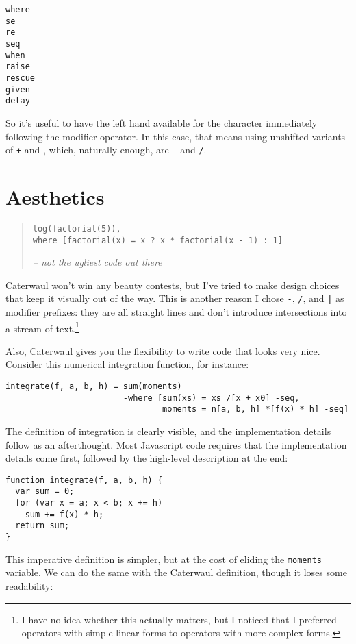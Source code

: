\documentclass{report}
\begin{document}
\begin{verbatim}
where
se
re
seq
when
raise
rescue
given
delay
\end{verbatim}

    So it's useful to have the left hand available for the character immediately following the modifier operator. In this case, that means using unshifted variants of {\tt +} and {\tt *},
    which, naturally enough, are {\tt -} and {\tt /}.

\section{Aesthetics}
\begin{quote}
\begin{verbatim}
log(factorial(5)),
where [factorial(x) = x ? x * factorial(x - 1) : 1]
\end{verbatim}
\hfill \textit{-- not the ugliest code out there}
\end{quote}

    Caterwaul won't win any beauty contests, but I've tried to make design choices that keep it visually out of the way. This is another reason I chose {\tt -}, {\tt /}, and {\tt |} as
    modifier prefixes: they are all straight lines and don't introduce intersections into a stream of text.\footnote{I have no idea whether this actually matters, but I noticed that I
    preferred operators with simple linear forms to operators with more complex forms.}

    Also, Caterwaul gives you the flexibility to write code that looks very nice. Consider this numerical integration function, for instance:

\begin{verbatim}
integrate(f, a, b, h) = sum(moments)
                        -where [sum(xs) = xs /[x + x0] -seq,
                                moments = n[a, b, h] *[f(x) * h] -seq]
\end{verbatim}

    The definition of integration is clearly visible, and the implementation details follow as an afterthought. Most Javascript code requires that the implementation details come first,
    followed by the high-level description at the end:

\begin{verbatim}
function integrate(f, a, b, h) {
  var sum = 0;
  for (var x = a; x < b; x += h)
    sum += f(x) * h;
  return sum;
}
\end{verbatim}

    This imperative definition is simpler, but at the cost of eliding the {\tt moments} variable. We can do the same with the Caterwaul definition, though it loses some readability:
\end{document}
